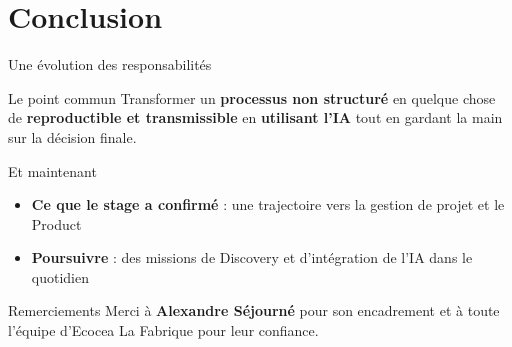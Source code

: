 \section{Conclusion}

\begin{frame}{Une évolution des responsabilités}
  \begin{center}
  \end{center}
  \vskip 6pt
  \begin{block}{Le point commun}
    \footnotesize Transformer un \textbf{processus non structuré} en quelque chose de \textbf{reproductible et transmissible} en \textbf{utilisant l'IA} tout en gardant la main sur la décision finale.
  \end{block}
\end{frame}

\begin{frame}{Et maintenant}
  \begin{itemize}\footnotesize
    \item \textbf{Ce que le stage a confirmé} : une trajectoire vers la gestion de projet et le Product
    \item \textbf{Poursuivre} : des missions de Discovery et d'intégration de l'IA dans le quotidien
  \end{itemize}
  \vskip 8pt
  \begin{exampleblock}{Remerciements}
    \footnotesize Merci à \textbf{Alexandre Séjourné} pour son encadrement et à toute l'équipe d'Ecocea La Fabrique pour leur confiance.
  \end{exampleblock}
\end{frame}
